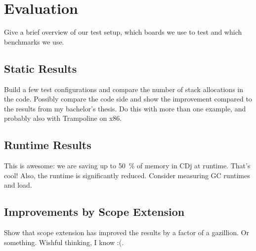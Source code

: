 
\chapter{Evaluation}
	\label{chapter:eval}
	Give a brief overview of our test setup, which boards we use to test and which benchmarks we use.

	\section{Static Results}
		\label{sec:eval:static}
		Build a few test configurations and compare the number of stack allocations in the code. Possibly compare the code
		side and show the improvement compared to the results from my bachelor's thesis. Do this with more than one example,
		and probably also with Trampoline on x86.

	\section{Runtime Results}
		\label{sec:eval:runtime}
		This is awesome: we are saving up to 50\ \% of memory in CDj at runtime. That's cool! Also, the runtime is
		significantly reduced. Consider measuring GC runtimes and load.

	\section{Improvements by Scope Extension}
		\label{sec:eval:scopeext}
		Show that scope extension has improved the results by a factor of a gazillion. Or something. Wishful thinking,
		I know :(.

